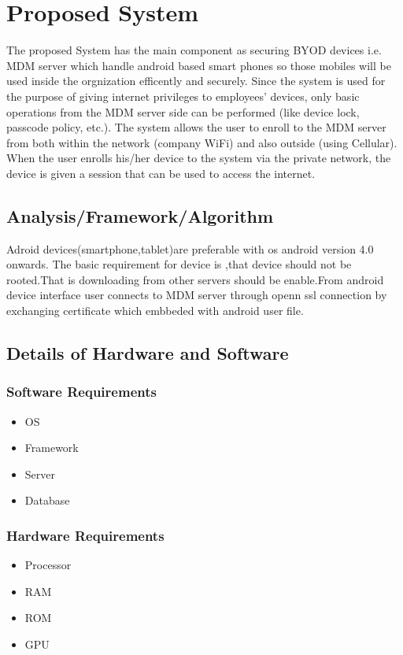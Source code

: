 \graphicspath{ {images/} }
\chapter{Proposed System}
\hspace{5mm} The proposed System has the main component as securing BYOD devices i.e. MDM server which handle android based smart phones so those mobiles will be used inside the orgnization efficently and securely. Since the system is used for the purpose of giving internet privileges to employees’ devices, only basic operations from the MDM server side can be performed (like device lock, passcode policy, etc.). The system allows the user to enroll to the MDM server from both within the network (company WiFi) and also outside (using Cellular). When the user enrolls his/her device to the system via the private network, the device is given a session that can be used to access the internet.  


\section{Analysis/Framework/Algorithm}
\hspace{5mm} Adroid devices(smartphone,tablet)are preferable with os android version 4.0 onwards.
The basic requirement for device is ,that device should not be rooted.That is downloading from other servers should be enable.From android device interface user connects to MDM server through openn ssl connection by exchanging certificate which embbeded with android user file.
\section{Details of Hardware and Software}
\subsection{Software Requirements} 

\begin{itemize}
    \item OS
    \item Framework
    \item Server
    \item Database
\end{itemize}

\subsection{Hardware Requirements} 
\begin{itemize}
    \item Processor
    \item RAM
    \item ROM
    \item GPU
\end{itemize}

